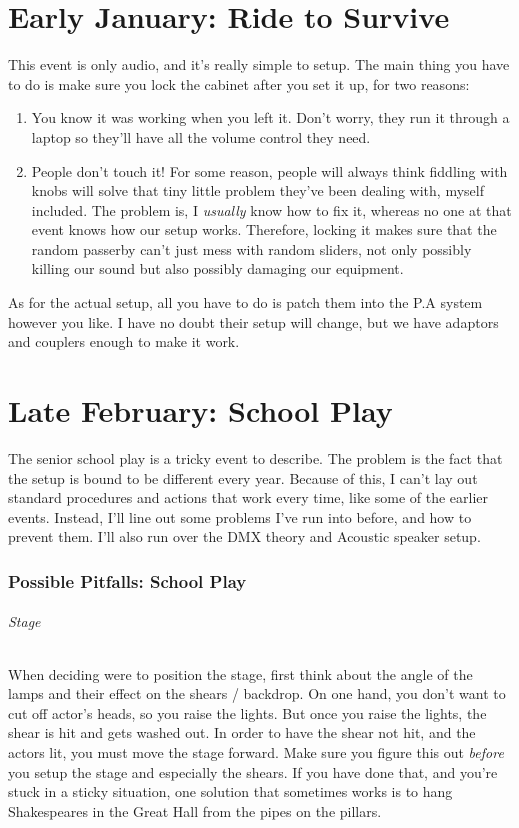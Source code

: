 \documentclass[11pt,a4paper]{book}
\begin{document}
\chapter{Early January: Ride to Survive}
This event is only audio, and it's really simple to setup. The main thing you have to do is make sure you lock the cabinet after you set it up, for two reasons:
\begin{enumerate}
\item You know it was working when you left it. Don't worry, they run it through a laptop so they'll have all the volume control they need.
\item People don't touch it! For some reason, people will always think fiddling with knobs will solve that tiny little problem they've been dealing with, myself included. The problem is, I \textit{usually} know how to fix it, whereas no one at that event knows how our setup works. Therefore, locking it makes sure that the random passerby can't just mess with random sliders, not only possibly killing our sound but also possibly damaging our equipment. 
\end{enumerate}

As for the actual setup, all you have to do is patch them into the P.A system however you like. I have no doubt their setup will change, but we have adaptors and couplers enough to make it work.

\chapter{Late February: School Play}
The senior school play is a tricky event to describe. The problem is the fact that the setup is bound to be different every year. Because of this, I can't lay out standard procedures and actions that work every time, like some of the earlier events. Instead, I'll line out some problems I've run into before, and how to prevent them. I'll also run over the DMX theory and Acoustic speaker setup.  

\subsection{Possible Pitfalls: School Play}

\subparagraph{Stage} When deciding were to position the stage, first think about the angle of the lamps and their effect on the shears / backdrop. On one hand, you don't want to cut off actor's heads, so you raise the lights. But once you raise the lights, the shear is hit and gets washed out. In order to have the shear not hit, and the actors lit, you must move the stage forward. Make sure you figure this out \textit{before} you setup the stage and especially the shears. If you have done that, and you're stuck in a sticky situation, one solution that sometimes works is to hang Shakespeares in the Great Hall from the pipes on the pillars. 
\end{document}
